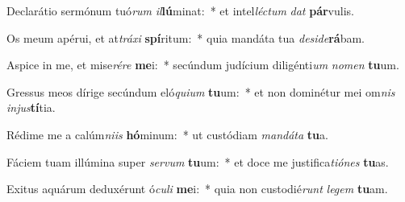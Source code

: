 \item Declarátio sermónum tuó\textit{rum} \textit{il}\textbf{lú}minat:~* et intel\textit{léc}\textit{tum} \textit{dat} \textbf{pár}vulis.
\item Os meum apérui, et at\textit{trá}\textit{xi} \textbf{spí}ritum:~* quia mandáta tua \textit{de}\textit{si}\textit{de}\textbf{rá}bam.
\item Aspice in me, et mise\textit{ré}\textit{re} \textbf{me}i:~* secúndum judícium diligénti\textit{um} \textit{no}\textit{men} \textbf{tu}um.
\item Gressus meos dírige secúndum eló\textit{qui}\textit{um} \textbf{tu}um:~* et non dominétur mei om\textit{nis} \textit{in}\textit{jus}\textbf{tí}tia.
\item Rédime me a calúm\textit{ni}\textit{is} \textbf{hó}minum:~* ut custódiam \textit{man}\textit{dá}\textit{ta} \textbf{tu}a.
\item Fáciem tuam illúmina super \textit{ser}\textit{vum} \textbf{tu}um:~* et doce me justifica\textit{ti}\textit{ó}\textit{nes} \textbf{tu}as.
\item Exitus aquárum deduxérunt ó\textit{cu}\textit{li} \textbf{me}i:~* quia non custodié\textit{runt} \textit{le}\textit{gem} \textbf{tu}am.
